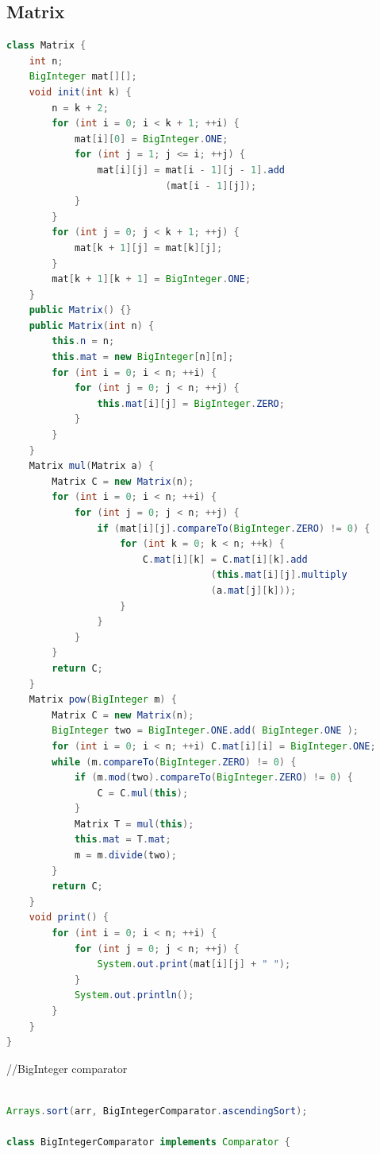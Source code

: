 \documentclass[twocolumn]{article}
\begin{document}
\begin{twocolumn}
\subsection{Matrix}
\begin{lstlisting}[language={Java}]
class Matrix {
    int n;
    BigInteger mat[][];
    void init(int k) {
        n = k + 2;
        for (int i = 0; i < k + 1; ++i) {
            mat[i][0] = BigInteger.ONE;
            for (int j = 1; j <= i; ++j) {
                mat[i][j] = mat[i - 1][j - 1].add
                            (mat[i - 1][j]);
            }
        }
        for (int j = 0; j < k + 1; ++j) {
            mat[k + 1][j] = mat[k][j];
        }
        mat[k + 1][k + 1] = BigInteger.ONE;
    }
    public Matrix() {}
    public Matrix(int n) {
        this.n = n;
        this.mat = new BigInteger[n][n];
        for (int i = 0; i < n; ++i) {
            for (int j = 0; j < n; ++j) {
                this.mat[i][j] = BigInteger.ZERO;
            }
        }
    }
    Matrix mul(Matrix a) {
        Matrix C = new Matrix(n);
        for (int i = 0; i < n; ++i) {
            for (int j = 0; j < n; ++j) {
                if (mat[i][j].compareTo(BigInteger.ZERO) != 0) {
                    for (int k = 0; k < n; ++k) {
                        C.mat[i][k] = C.mat[i][k].add
                                    (this.mat[i][j].multiply
                                    (a.mat[j][k]));
                    }
                }
            }
        }
        return C;
    }
    Matrix pow(BigInteger m) {
        Matrix C = new Matrix(n);
        BigInteger two = BigInteger.ONE.add( BigInteger.ONE );
        for (int i = 0; i < n; ++i) C.mat[i][i] = BigInteger.ONE;
        while (m.compareTo(BigInteger.ZERO) != 0) {
            if (m.mod(two).compareTo(BigInteger.ZERO) != 0) {
                C = C.mul(this);
            }
            Matrix T = mul(this);
            this.mat = T.mat;
            m = m.divide(two);
        }
        return C;
    }
    void print() {
        for (int i = 0; i < n; ++i) {
            for (int j = 0; j < n; ++j) {
                System.out.print(mat[i][j] + " ");
            }
            System.out.println();
        }
    }
}
\end{lstlisting}

//BigInteger comparator
\begin{lstlisting}[language={Java}]

Arrays.sort(arr, BigIntegerComparator.ascendingSort);

class BigIntegerComparator implements Comparator {


\end{lstlisting}
\end{twocolumn}
\end{document}
